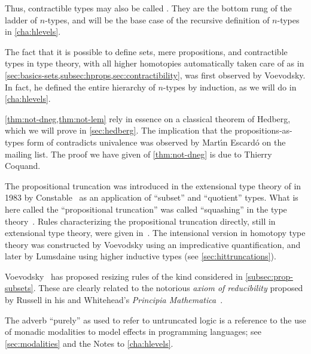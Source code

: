 Thus, contractible types may also be called .
They are the bottom rung of the ladder of $n$-types, and will be the base case of the recursive definition of $n$-types in \autoref{cha:hlevels}.

%
%

\sectionNotes

The fact that it is possible to define sets, mere propositions, and contractible types in type theory, with all higher homotopies automatically taken care of as in \autoref{sec:basics-sets,subsec:hprops,sec:contractibility}, was first observed by Voevodsky.
In fact, he defined the entire hierarchy of $n$-types by induction, as we will do in \autoref{cha:hlevels}.%

\autoref{thm:not-dneg,thm:not-lem} rely in essence on a classical theorem of Hedberg,
%
%
which we will prove in \autoref{sec:hedberg}.
The implication that the propositions-as-types form of \LEM{} contradicts univalence was observed by Mart\'\i n Escard\'o on the \Agda mailing list.
The proof we have given of \autoref{thm:not-dneg} is due to Thierry Coquand.

The propositional truncation was introduced in the extensional type theory of
%
\NuPRL in 1983 by Constable~\cite{Con85} as an
application of ``subset'' and ``quotient'' types.  What is here called the
``propositional truncation'' was called ``squashing'' in the \NuPRL type theory~\cite{constable+86nuprl-book}.
Rules characterizing the propositional truncation directly, still in extensional type theory, were given in~\cite{ab:bracket-types}.
The intensional version in homotopy type theory was constructed by Voevodsky using an impredicative quantification, and later by Lumsdaine using higher inductive types (see \autoref{sec:hittruncations}).

%
Voevodsky~\cite{Universe-poly} has proposed resizing rules of the kind considered in \autoref{subsec:prop-subsets}.
%
These are clearly related to the notorious \emph{axiom of reducibility} proposed by Russell in his and Whitehead's \emph{Principia Mathematica}~\cite{PM2}.

The adverb ``purely'' as used to refer to untruncated logic is a reference to the use of monadic modalities to model effects in programming languages; see \autoref{sec:modalities} and the Notes to \autoref{cha:hlevels}.

